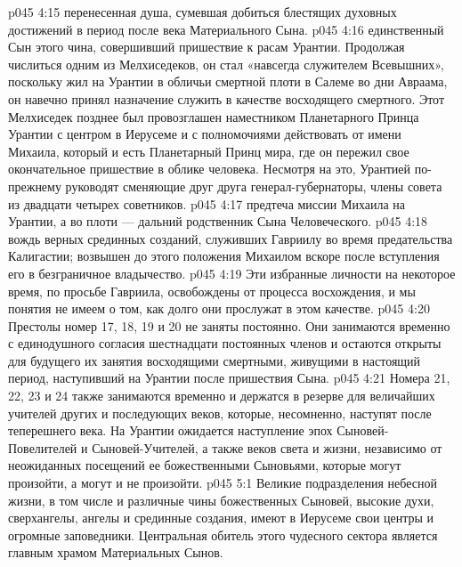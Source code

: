 \vs p045 4:15 \pc {}\bibnobreakspace {} перенесенная душа, сумевшая добиться блестящих духовных достижений в период после века Материального Сына.
\vs p045 4:16 \pc {}\bibnobreakspace {} единственный Сын этого чина, совершивший пришествие к расам Урантии. Продолжая числиться одним из Мелхиседеков, он стал «навсегда служителем Всевышних», поскольку жил на Урантии в обличьи смертной плоти в Салеме во дни Авраама, он навечно принял назначение служить в качестве восходящего смертного. Этот Мелхиседек позднее был провозглашен наместником Планетарного Принца Урантии с центром в Иерусеме и с полномочиями действовать от имени Михаила, который и есть Планетарный Принц мира, где он пережил свое окончательное пришествие в облике человека. Несмотря на это, Урантией по\hyp{}прежнему руководят сменяющие друг друга генерал\hyp{}губернаторы, члены совета из двадцати четырех советников.
\vs p045 4:17 \pc {}\bibnobreakspace {} предтеча миссии Михаила на Урантии, а во плоти --- дальний родственник Сына Человеческого.
\vs p045 4:18 \pc {}\bibnobreakspace {} вождь верных срединных созданий, служивших Гавриилу во время предательства Калигастии; возвышен до этого положения Михаилом вскоре после вступления его в безграничное владычество.
\vs p045 4:19 \pc Эти избранные личности на некоторое время, по просьбе Гавриила, освобождены от процесса восхождения, и мы понятия не имеем о том, как долго они прослужат в этом качестве.
\vs p045 4:20 Престолы номер 17, 18, 19 и 20 не заняты постоянно. Они занимаются временно с единодушного согласия шестнадцати постоянных членов и остаются открыты для будущего их занятия восходящими смертными, живущими в настоящий период, наступивший на Урантии после пришествия Сына.
\vs p045 4:21 Номера 21, 22, 23 и 24 также занимаются временно и держатся в резерве для величайших учителей других и последующих веков, которые, несомненно, наступят после теперешнего века. На Урантии ожидается наступление эпох Сыновей\hyp{}Повелителей и Сыновей\hyp{}Учителей, а также веков света и жизни, независимо от неожиданных посещений ее божественными Сыновьями, которые могут произойти, а могут и не произойти.
\vs p045 5:1 Великие подразделения небесной жизни, в том числе и различные чины божественных Сыновей, высокие духи, сверхангелы, ангелы и срединные создания, имеют в Иерусеме свои центры и огромные заповедники. Центральная обитель этого чудесного сектора является главным храмом Материальных Сынов.
